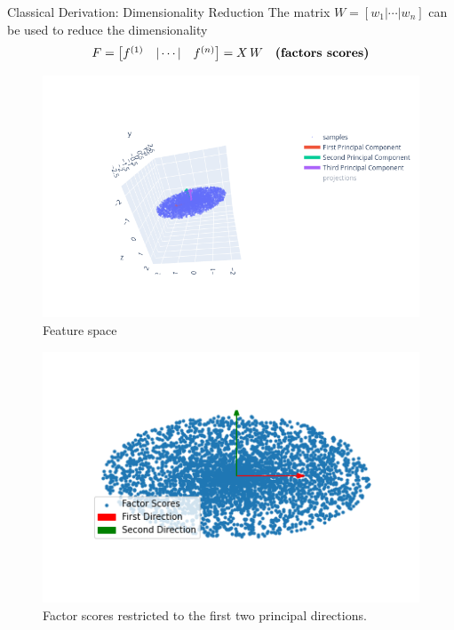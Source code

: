 \documentclass[10pt]{beamer}
\theoremstyle{definition}
\newcommand{\1}{\mathbbm{1}}
\begin{document}
\begin{frame}{Classical Derivation: Dimensionality Reduction}
  The matrix $W=[w_1|\cdots|w_n]$ can be used to reduce the dimensionality
  \[
    F=
    \begin{bmatrix}
      f^{(1)}&|\cdots|&f^{(n)}
    \end{bmatrix}
    = X\,W\quad\mbox{\bf (factors scores)}
  \]
  \begin{minipage}[t]{0.4\textwidth}
    \begin{figure}[h!]
      \centering
      \includegraphics[clip, scale=0.4, trim=1cm 1.5cm 8cm 4cm]{./pic/PCA_3D.png}
      \caption{Feature space}
    \end{figure}
  \end{minipage}\hfill
  \begin{minipage}[t]{0.5\textwidth}
    \begin{figure}[h!]
      \centering
      \includegraphics[scale=0.3]{./pic/PCA_2D.png}
      \caption{Factor scores restricted to the first two principal
      directions.}
    \end{figure}
  \end{minipage}
\end{frame}
\end{document}
